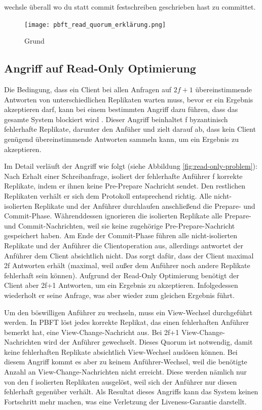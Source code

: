 \documentclass[nonacm,sigconf,natbib=false]{acmart}
\begin{document}
wechsle überall wo du statt commit festschreiben geschrieben hast zu committet.
\begin{figure}[htbp]
  \centering
  \texttt{[image: pbft\_read\_quorum\_erklärung.png]}
  \caption{Grund}
  \label{fig:pbft-optimization}
\end{figure}

\subsection{Angriff auf Read-Only Optimierung}

Die Bedingung, dass ein Client bei allen Anfragen auf $2f+1$ übereinstimmende Antworten von unterschiedlichen Replikaten warten muss, bevor er ein Ergebnis akzeptieren darf, kann bei einem bestimmten Angriff dazu führen, dass das gesamte System blockiert wird \cite{pbft-liveness-problem}. Dieser Angriff beinhaltet f byzantinisch fehlerhafte Replikate, darunter den Anfüher und zielt darauf ab, dass kein Client genügend übereinstimmende Antworten sammeln kann, um ein Ergebnis zu akzeptieren.

Im Detail verläuft der Angriff wie folgt (siehe Abbildung \ref{fig:read-only-problem}): Nach Erhalt einer Schreibanfrage, isoliert der fehlerhafte Anführer f korrekte Replikate, indem er ihnen keine Pre-Prepare Nachricht sendet. Den restlichen Replikaten verhält er sich dem Protokoll entsprechend richtig. Alle nicht-isolierten Replikate und der Anführer durchlaufen anschließend die Prepare- und Commit-Phase. Währenddessen ignorieren die isolierten Replikate alle Prepare- und Commit-Nachrichten, weil sie keine zugehörige Pre-Prepare-Nachricht gespeichert haben. Am Ende der Commit-Phase führen alle nicht-isolierten Replikate und der Anführer die Clientoperation aus, allerdings antwortet der Anführer dem Client absichtlich nicht. Das sorgt dafür, dass der Client maximal 2f Antworten erhält (maximal, weil außer dem Anführer noch andere Replikate fehlerhaft sein können). Aufgrund der Read-Only Optimierung benötigt der Client aber 2f+1 Antworten, um ein Ergebnis zu akzeptieren. Infolgedessen wiederholt er seine Anfrage, was aber wieder zum gleichen Ergebnis führt.

Um den böswilligen Anführer zu wechseln, muss ein View-Wechsel durchgeführt werden. In PBFT löst jedes korrekte Replikat, das einen fehlerhaften Anführer bemerkt hat, eine View-Change-Nachricht aus. Bei 2f+1 View-Change-Nachrichten wird der Anführer gewechselt. Dieses Quorum ist notwendig, damit keine fehlerhaften Replikate absichtlich View-Wechsel auslösen können. Bei diesem Angriff kommt es aber zu keinem Anführer-Wechsel, weil die benötigte Anzahl an View-Change-Nachrichten nicht erreicht. Diese werden nämlich nur von den f isolierten Replikaten ausgelöst, weil sich der Anführer nur diesen fehlerhaft gegenüber verhält. Als Resultat dieses Angriffs kann das System keinen Fortschritt mehr machen, was eine Verletzung der Liveness-Garantie darstellt.
\end{document}
